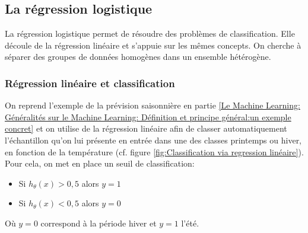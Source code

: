 \subsection{La régression logistique}
\label{Le Machine Learning: Les différents algorithmes: La regression logistique}
La régression logistique permet de résoudre des problèmes de classification. Elle découle de la régression linéaire et s'appuie sur les mêmes concepts.
On cherche à séparer des groupes de données homogènes dans un ensemble hétérogène. 

\subsubsection{Régression linéaire et classification}
\label{Le Machine Learning: Les différents algorithmes: La regression logistique: Régression linéaire et classification}
On reprend l'exemple de la prévision saisonnière en partie \ref{Le Machine Learning: Généralités sur le Machine Learning: Définition et principe général:un exemple concret} et on utilise de la régression linéaire afin de classer automatiquement l'échantillon qu'on lui présente en entrée dans une des classes printemps ou hiver, en fonction de la température (cf. figure \ref{fig:Classification via regression linéaire}). \\
Pour cela, on met en place un seuil de classification:
\begin{itemize}
	\item Si $h_\theta(x) > 0,5$ alors $y=1$
	\item Si $h_\theta(x) < 0,5$ alors $y=0$
\end{itemize}

Où $y = 0$ correspond à la période hiver et $y = 1$ l'été. 

